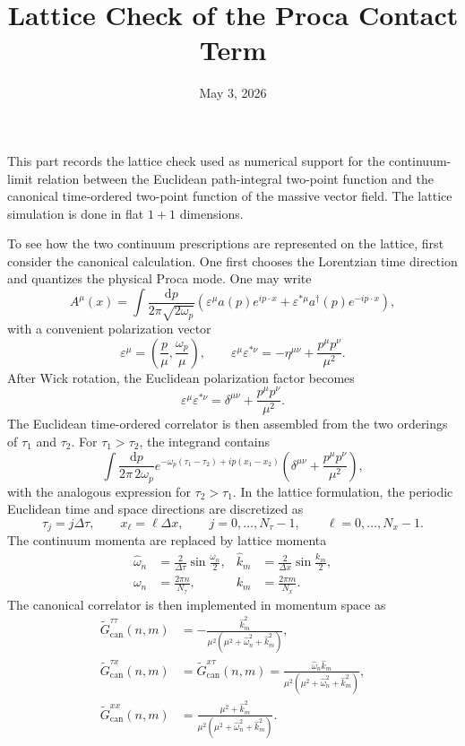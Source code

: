 \documentclass[11pt]{article}
\title{Lattice Check of the Proca Contact Term}
\author{}
\date{May 3, 2026}
\begin{document}
\maketitle

This part records the lattice check used as numerical support for the continuum-limit relation between the Euclidean path-integral two-point function and the canonical time-ordered two-point function of the massive vector field. The lattice simulation is done in flat $1+1$ dimensions.

To see how the two continuum prescriptions are represented on the lattice, first consider the canonical calculation. One first chooses the Lorentzian time direction and quantizes the physical Proca mode. One may write
\[
A^{\mu}(x)=\int \frac{\mathrm{d}p}{2\pi\sqrt{2\omega_{p}}}
\left(\varepsilon^{\mu}a(p)e^{ip\cdot x}
+\varepsilon^{*\mu}a^{\dagger}(p)e^{-ip\cdot x}\right),
\]
with a convenient polarization vector
\[
\varepsilon^{\mu}
=\left(\frac{p}{\mu},\frac{\omega_{p}}{\mu}\right),
\qquad
\varepsilon^{\mu}\varepsilon^{*\nu}
=-\eta^{\mu\nu}+\frac{p^{\mu}p^{\nu}}{\mu^{2}}.
\]
After Wick rotation, the Euclidean polarization factor becomes
\[
\varepsilon^{\mu}\varepsilon^{*\nu}
=\delta^{\mu\nu}+\frac{p^{\mu}p^{\nu}}{\mu^{2}}.
\]
The Euclidean time-ordered correlator is then assembled from the two orderings of $\tau_{1}$ and $\tau_{2}$. For $\tau_{1}>\tau_{2}$, the integrand contains
\[
\int \frac{\mathrm{d}p}{2\pi\,2\omega_{p}}
e^{-\omega_{p}(\tau_{1}-\tau_{2})+ip(x_{1}-x_{2})}
\left(\delta^{\mu\nu}+\frac{p^{\mu}p^{\nu}}{\mu^{2}}\right),
\]
with the analogous expression for $\tau_{2}>\tau_{1}$. In the lattice formulation, the periodic Euclidean time and space directions are discretized as
\[
\tau_{j}=j\Delta\tau,\qquad x_{\ell}=\ell\Delta x,
\qquad
j=0,\dots,N_{\tau}-1,\qquad \ell=0,\dots,N_{x}-1.
\]
The continuum momenta are replaced by lattice momenta
\begin{align}
\widehat{\omega}_{n}
&=\frac{2}{\Delta\tau}\sin\frac{\omega_{n}}{2},
&
\widehat{k}_{m}
&=\frac{2}{\Delta x}\sin\frac{k_{m}}{2},
\\
\omega_{n}
&=\frac{2\pi n}{N_{\tau}},
&
k_{m}
&=\frac{2\pi m}{N_{x}}.
\end{align}
The canonical correlator is then implemented in momentum space as
\begin{align}
\widetilde{G}_{\text{can}}^{\tau\tau}(n,m)
&=-\frac{\widehat{k}_{m}^{2}}
{\mu^{2}\left(\mu^{2}+\widehat{\omega}_{n}^{2}+\widehat{k}_{m}^{2}\right)},
\\
\widetilde{G}_{\text{can}}^{\tau x}(n,m)
&=\widetilde{G}_{\text{can}}^{x\tau}(n,m)
=\frac{\widehat{\omega}_{n}\widehat{k}_{m}}
{\mu^{2}\left(\mu^{2}+\widehat{\omega}_{n}^{2}+\widehat{k}_{m}^{2}\right)},
\\
\widetilde{G}_{\text{can}}^{xx}(n,m)
&=\frac{\mu^{2}+\widehat{k}_{m}^{2}}
{\mu^{2}\left(\mu^{2}+\widehat{\omega}_{n}^{2}+\widehat{k}_{m}^{2}\right)}.
\end{align}
\end{document}
